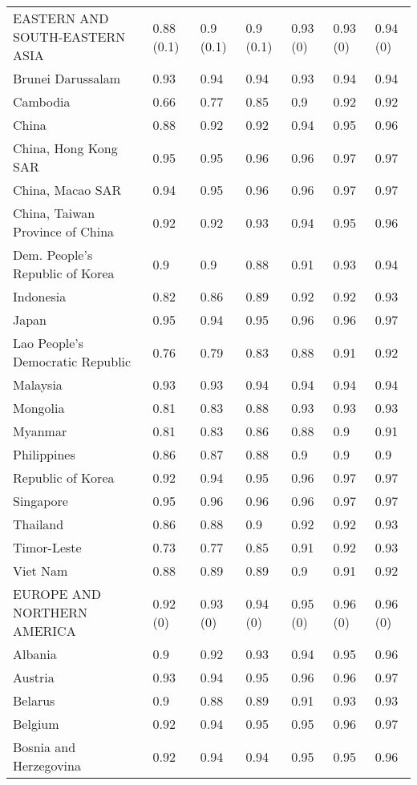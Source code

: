 \begin{longtable}[t]{lllllll}
EASTERN AND SOUTH-EASTERN ASIA & 0.88 (0.1) & 0.9 (0.1) & 0.9 (0.1) & 0.93 (0) & 0.93 (0) & 0.94 (0)\\
Brunei Darussalam & 0.93 & 0.94 & 0.94 & 0.93 & 0.94 & 0.94\\
Cambodia & 0.66 & 0.77 & 0.85 & 0.9 & 0.92 & 0.92\\
China & 0.88 & 0.92 & 0.92 & 0.94 & 0.95 & 0.96\\
China, Hong Kong SAR & 0.95 & 0.95 & 0.96 & 0.96 & 0.97 & 0.97\\
China, Macao SAR & 0.94 & 0.95 & 0.96 & 0.96 & 0.97 & 0.97\\
China, Taiwan Province of China & 0.92 & 0.92 & 0.93 & 0.94 & 0.95 & 0.96\\
Dem. People's Republic of Korea & 0.9 & 0.9 & 0.88 & 0.91 & 0.93 & 0.94\\
Indonesia & 0.82 & 0.86 & 0.89 & 0.92 & 0.92 & 0.93\\
Japan & 0.95 & 0.94 & 0.95 & 0.96 & 0.96 & 0.97\\
Lao People's Democratic Republic & 0.76 & 0.79 & 0.83 & 0.88 & 0.91 & 0.92\\
Malaysia & 0.93 & 0.93 & 0.94 & 0.94 & 0.94 & 0.94\\
Mongolia & 0.81 & 0.83 & 0.88 & 0.93 & 0.93 & 0.93\\
Myanmar & 0.81 & 0.83 & 0.86 & 0.88 & 0.9 & 0.91\\
Philippines & 0.86 & 0.87 & 0.88 & 0.9 & 0.9 & 0.9\\
Republic of Korea & 0.92 & 0.94 & 0.95 & 0.96 & 0.97 & 0.97\\
Singapore & 0.95 & 0.96 & 0.96 & 0.96 & 0.97 & 0.97\\
Thailand & 0.86 & 0.88 & 0.9 & 0.92 & 0.92 & 0.93\\
Timor-Leste & 0.73 & 0.77 & 0.85 & 0.91 & 0.92 & 0.93\\
Viet Nam & 0.88 & 0.89 & 0.89 & 0.9 & 0.91 & 0.92\\
EUROPE AND NORTHERN AMERICA & 0.92 (0) & 0.93 (0) & 0.94 (0) & 0.95 (0) & 0.96 (0) & 0.96 (0)\\
Albania & 0.9 & 0.92 & 0.93 & 0.94 & 0.95 & 0.96\\
Austria & 0.93 & 0.94 & 0.95 & 0.96 & 0.96 & 0.97\\
Belarus & 0.9 & 0.88 & 0.89 & 0.91 & 0.93 & 0.93\\
Belgium & 0.92 & 0.94 & 0.95 & 0.95 & 0.96 & 0.97\\
Bosnia and Herzegovina & 0.92 & 0.94 & 0.94 & 0.95 & 0.95 & 0.96\\

\end{longtable}
